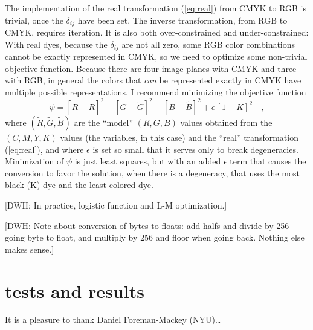\documentclass[letterpaper,preprint,dvipdf]{aastex}
\begin{document}
The implementation of the real transformation (\ref{eq:real}) from
CMYK to RGB is trivial, once the $\delta_{ij}$ have been set.  The
inverse transformation, from RGB to CMYK, requires iteration.  It is
also both over-constrained and under-constrained:  With real
dyes, because the $\delta_{ij}$ are not all zero, some RGB color
combinations cannot be exactly represented in CMYK, so we need to
optimize some non-trivial objective function.  Because there are four
image planes with CMYK and three with RGB, in general the colors that
\emph{can} be represented exactly in CMYK have multiple possible
representations.  I recommend minimizing the objective function
\begin{equation}
\psi = [R-\tilde{R}]^2
     + [G-\tilde{G}]^2
     + [B-\tilde{B}]^2
     + \epsilon\,[1-K]^2 \quad ,
\end{equation}
where $(\tilde{R},\tilde{G},\tilde{B})$ are the ``model'' $(R,G,B)$
values obtained from the $(C,M,Y,K)$ values (the variables, in this
case) and the ``real'' transformation (\ref{eq:real}), and where
$\epsilon$ is set so small that it serves only to break degeneracies.
Minimization of $\psi$ is just least squares, but with an added
$\epsilon$ term that causes the conversion to favor the solution, when
there is a degeneracy, that uses the most black (K) dye and the least
colored dye.

[DWH: In practice, logistic function and L-M optimization.]

[DWH: Note about conversion of bytes to floats: add halfs and divide
  by 256 going byte to float, and multiply by 256 and floor when going
  back.  Nothing else makes sense.]

\section{tests and results}

\acknowledgments It is a pleasure to thank Daniel Foreman-Mackey (NYU)\ldots




\end{document}
